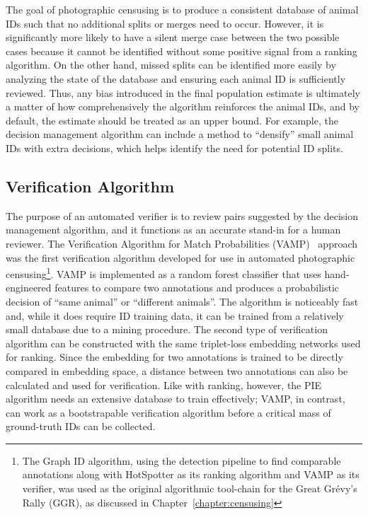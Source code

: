 The goal of photographic censusing is to produce a consistent database of animal IDs such that no additional splits or merges need to occur.  However, it is significantly more likely to have a silent merge case between the two possible cases because it cannot be identified without some positive signal from a ranking algorithm.  On the other hand, missed splits can be identified more easily by analyzing the state of the database and ensuring each animal ID is sufficiently reviewed. Thus, any bias introduced in the final population estimate is ultimately a matter of how comprehensively the algorithm reinforces the animal IDs, and by default, the estimate should be treated as an upper bound.  For example, the decision management algorithm can include a method to ``densify'' small animal IDs with extra decisions, which helps identify the need for potential ID splits.

\subsection{Verification Algorithm}

The purpose of an automated verifier is to review pairs suggested by the decision management algorithm, and it functions as an accurate stand-in for a human reviewer.  The Verification Algorithm for Match Probabilities (VAMP)~\cite{crall_identifying_2017} approach was the first verification algorithm developed for use in automated photographic censusing\footnote{The Graph ID algorithm, using the detection pipeline to find comparable annotations along with HotSpotter as its ranking algorithm and VAMP as its verifier, was used as the original algorithmic tool-chain for the Great Gr\'evy's Rally (GGR), as discussed in Chapter~\ref{chapter:censusing}}.  VAMP is implemented as a random forest classifier that uses hand-engineered features to compare two annotations and produces a probabilistic decision of ``same animal'' or ``different animals''.  The algorithm is noticeably fast and, while it does require ID training data, it can be trained from a relatively small database due to a mining procedure.  The second type of verification algorithm can be constructed with the same triplet-loss embedding networks used for ranking.  Since the embedding for two annotations is trained to be directly compared in embedding space, a distance between two annotations can also be calculated and used for verification.  Like with ranking, however, the PIE algorithm needs an extensive database to train effectively; VAMP, in contrast, can work as a bootstrapable verification algorithm before a critical mass of ground-truth IDs can be collected.

